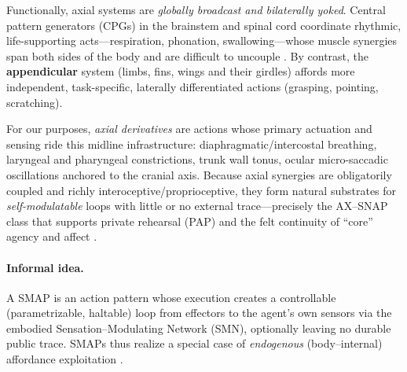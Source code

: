 Functionally, axial systems are \emph{globally broadcast and bilaterally yoked}. Central pattern generators (CPGs) in the brainstem and spinal cord coordinate rhythmic, life-supporting acts—respiration, phonation, swallowing—whose muscle synergies span both sides of the body and are difficult to uncouple \citep{FeldmanDelNegro2006RespiratoryRhythm,DelNegro2018BreathingMatters}. By contrast, the \textbf{appendicular} system (limbs, fins, wings and their girdles) affords more independent, task-specific, laterally differentiated actions (grasping, pointing, scratching).

For our purposes, \emph{axial derivatives} are actions whose primary actuation and sensing ride this midline infrastructure: diaphragmatic/intercostal breathing, laryngeal and pharyngeal constrictions, trunk wall tonus, ocular micro-saccadic oscillations anchored to the cranial axis. Because axial synergies are obligatorily coupled and richly interoceptive/proprioceptive, they form natural substrates for \emph{self-modulatable} loops with little or no external trace—precisely the AX–SNAP class that supports private rehearsal (PAP) and the felt continuity of “core” agency and affect \citep{Seth2013InteroceptiveInference,Craig2002HowDoYouFeel}.


\paragraph{Informal idea.}
A SMAP is an action pattern whose execution creates a controllable (parametrizable, haltable) loop from effectors to the agent's own sensors via the embodied Sensation–Modulating Network (SMN), optionally leaving no durable public trace. SMAPs thus realize a special case of \emph{endogenous} (body–internal) affordance exploitation \citep{Varela1991EmbodiedMind,PezzuloCisek2016AffordanceLandscape}.

\newcommand{\Zones}{\mathcal{Z}}
\newcommand{\Sensors}{\mathcal{S}}
\newcommand{\Effectors}{\mathcal{E}}
\newcommand{\Modulators}{\mathcal{M}}
\newcommand{\Channels}{\mathcal{C}}
\newcommand{\Paths}{\mathcal{P}}
\newcommand{\Act}{\mathsf{Act}}
\newcommand{\Sens}{\mathsf{Sens}}
\newcommand{\modrel}{\leadsto}     %
\newcommand{\contact}{\mathrel{\circledast}} %
\newcommand{\bilat}{\mathrel{\approx}}       %
\newcommand{\trace}{\mathsf{Trace}}
\newcommand{\SMI}{\mathsf{SMI}}   %

